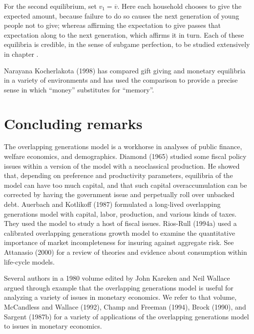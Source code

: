   For the second equilibrium, set $v_1 = \overline v$.   Here
each household chooses to give the expected amount, because
failure to do so causes  the next generation of
young people not to give; whereas affirming the expectation
to give passes that expectation along to the next generation,
which affirms it in turn.
Each of these equilibria is credible, in the sense
of subgame perfection, to be studied extensively in chapter
.


 Narayana Kocherlakota (1998) has  compared gift giving and monetary
equilibria in a variety of environments and has used the comparison to
provide a  precise sense in which ``money'' substitutes for ``memory''.

\section{Concluding remarks}
The overlapping generations model is a workhorse in
analyses of  public finance, welfare economics,
and demographics.  Diamond (1965) studied
some fiscal policy issues within a version of the model with a neoclassical production.
He showed that, depending on preference and productivity
parameters, equilibria of the model can
 have too much capital, and that such capital
overaccumulation can be corrected by having the government
issue and perpetually roll over unbacked debt.
Auerbach  and  Kotlikoff (1987)  formulated a long-lived overlapping
generations model with capital, labor, production, and
various kinds of taxes. They used the model to study
a host of fiscal issues. Rios-Rull (1994a) used a calibrated
overlapping generations growth model to examine
the quantitative importance of market incompleteness for
insuring against aggregate risk. See Attanasio (2000) for
a  review of theories and evidence
about consumption within life-cycle models.

Several authors in a 1980 volume edited by John Kareken
and Neil Wallace argued through example that the overlapping
generations model is useful for analyzing a variety of issues in
monetary economics.  We refer to that volume, McCandless
and Wallace (1992), Champ and Freeman (1994), Brock (1990),
and Sargent (1987b) for a variety of applications
of the overlapping generations model to issues in monetary
economics.


